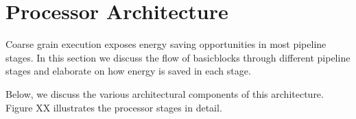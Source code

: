 \section{Processor Architecture}
\label{sec:arch}

Coarse grain execution exposes energy saving opportunities in most pipeline
stages. In this section we discuss the flow of basicblocks through different
pipeline stages and elaborate on how energy is saved in each stage.

Below, we discuss the various architectural components of this architecture.
Figure XX illustrates the processor stages in detail.






